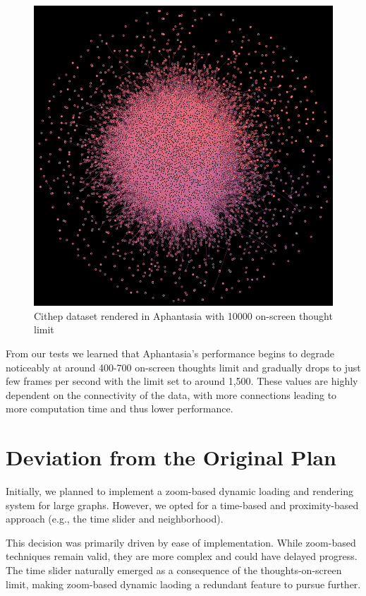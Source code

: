 \begin{figure}[p]
    \includegraphics[width=130mm, keepaspectratio]{img/afantazie_cithep_10000_on-screen-limit.png}
    \caption{Cithep dataset rendered in Aphantasia with 10000 on-screen thought limit}
    \label{obr:afantazie_cithep_10000_on-screen-limit}
\end{figure}

From our tests we learned that Aphantasia's performance begins to degrade noticeably at around 400-700 on-screen thoughts limit and gradually drops to just few frames per second with the limit set to around 1,500.
These values are highly dependent on the connectivity of the data, with more connections leading to more computation time and thus lower performance.

\section{Deviation from the Original Plan}
Initially, we planned to implement a zoom-based dynamic loading and rendering system for large graphs.
However, we opted for a time-based and proximity-based approach (e.g., the time slider and neighborhood).

This decision was primarily driven by ease of implementation.
While zoom-based techniques remain valid, they are more complex and could have delayed progress.
The time slider naturally emerged as a consequence of the thoughts-on-screen limit, making zoom-based dynamic laoding a redundant feature to pursue further.

